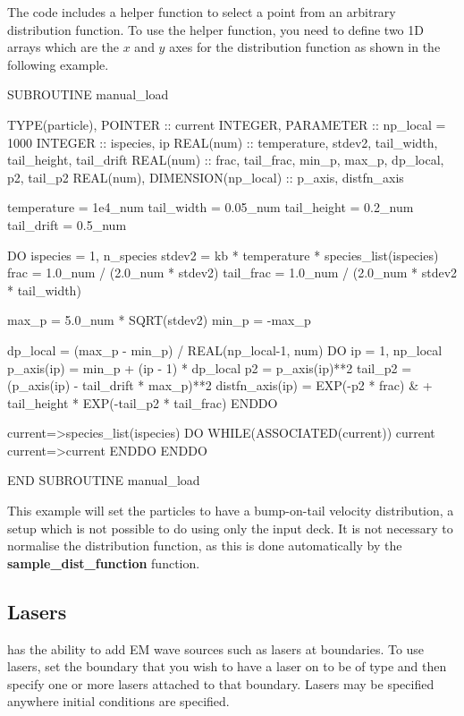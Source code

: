 The code includes a helper function to select a point from an arbitrary
distribution function. To use the helper function, you need to define two 1D
arrays which are the $x$ and $y$ axes for the distribution function as
shown in the following example.
\begin{boxverbatim}
  SUBROUTINE manual_load

    TYPE(particle), POINTER :: current
    INTEGER, PARAMETER :: np_local = 1000
    INTEGER :: ispecies, ip
    REAL(num) :: temperature, stdev2, tail_width, tail_height, tail_drift
    REAL(num) :: frac, tail_frac, min_p, max_p, dp_local, p2, tail_p2
    REAL(num), DIMENSION(np_local) :: p_axis, distfn_axis

    temperature = 1e4_num
    tail_width = 0.05_num
    tail_height = 0.2_num
    tail_drift = 0.5_num

    DO ispecies = 1, n_species
      stdev2 = kb * temperature * species_list(ispecies)%
      frac = 1.0_num / (2.0_num * stdev2)
      tail_frac = 1.0_num / (2.0_num * stdev2 * tail_width)

      max_p = 5.0_num * SQRT(stdev2)
      min_p = -max_p

      dp_local = (max_p - min_p) / REAL(np_local-1, num)
      DO ip = 1, np_local
        p_axis(ip) = min_p + (ip - 1) * dp_local
        p2 = p_axis(ip)**2
        tail_p2 = (p_axis(ip) - tail_drift * max_p)**2
        distfn_axis(ip) = EXP(-p2 * frac) &
            + tail_height * EXP(-tail_p2 * tail_frac)
      ENDDO

      current=>species_list(ispecies)%
      DO WHILE(ASSOCIATED(current))
        current%
        current=>current%
      ENDDO
    ENDDO

  END SUBROUTINE manual_load
\end{boxverbatim}

This example will set the particles to have a bump-on-tail velocity
distribution, a setup which is not possible to do using only the
input deck. It is not necessary to normalise
the distribution function, as this is done automatically by the
{\bf sample\_dist\_function} function.


\subsection{Lasers}
{\EPOCH} has the ability to add EM wave sources such as
lasers at boundaries. To use lasers, set the boundary that you
wish to have a laser on to be of type  and then
specify one or more lasers attached to that boundary. Lasers may be specified
anywhere initial conditions are specified.

